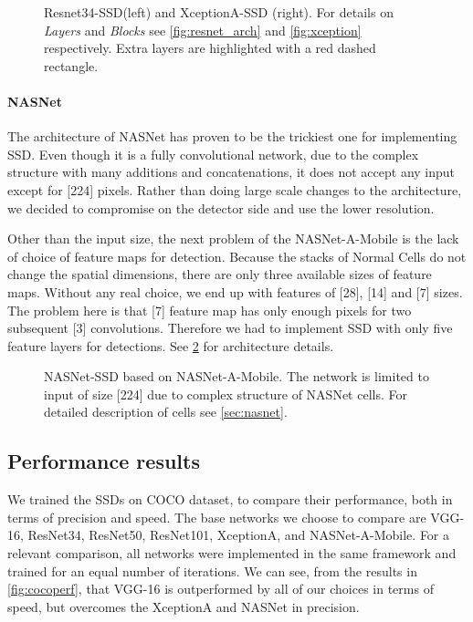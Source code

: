 \begin{figure}
    \centering
    \resnetSSD
    \caption[Resnet34-SSD and Xception-SSD]%
    {Resnet34-SSD(left) and XceptionA-SSD (right). For details on \textit{Layers} and \textit{Blocks} see \cref{fig:resnet_arch} and \cref{fig:xception} respectively. Extra layers are highlighted with a red dashed rectangle.}

    \label{fig:resnet_xception_SSD}
\end{figure}

\paragraph{NASNet} The architecture of NASNet has proven to be the trickiest one for implementing SSD. Even though it is a fully convolutional network, due to the complex structure with many additions and concatenations, it does not accept any input except for [224] pixels. Rather than doing large scale changes to the architecture, we decided to compromise on the detector side and use the lower resolution. 

Other than the input size, the next problem of the NASNet-A-Mobile is the lack of choice of feature maps for detection. Because the stacks of Normal Cells do not change the spatial dimensions, there are only three available sizes of feature maps. Without any real choice, we end up with features of [28], [14] and [7] sizes. The problem here is that [7] feature map has only enough pixels for two subsequent [3] convolutions. Therefore we had to implement SSD with only five feature layers for detections. See \cref{fig:nasnetSSD} for architecture details.


\begin{figure}
    \centering
    \nasnetSSD
    \caption[NASNet-SSD]%
    {NASNet-SSD based on NASNet-A-Mobile. The network is limited to input of size [224] due to complex structure of NASNet cells. For detailed description of cells see \cref{sec:nasnet}.}
    \label{fig:nasnetSSD}
\end{figure}

\subsection{Performance results}
We trained the SSDs on COCO dataset, to compare their performance, both in terms of precision and speed. The base networks we choose to compare are VGG-16, ResNet34, ResNet50, ResNet101, XceptionA, and NASNet-A-Mobile. For a relevant comparison, all networks were implemented in the same framework and trained for an equal number of iterations. We can see, from the results in \cref{fig:cocoperf}, that VGG-16 is outperformed by all of our choices in terms of speed, but overcomes the XceptionA and NASNet in precision. 

